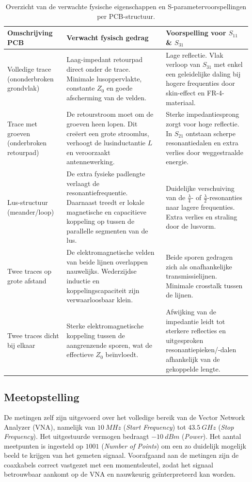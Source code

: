 \documentclass[twoside,kul]{kulakreport} %
\begin{document}
	\begin{table}[htbp]
		\centering
		\caption{Overzicht van de verwachte fysische eigenschappen en S-parametervoorspellingen per PCB-structuur.}
		\label{tab:traces_verwachtingen}
		\renewcommand{\arraystretch}{1.3}
		\begin{tabularx}{\textwidth}{>{\raggedright\arraybackslash}p{3.2cm} X X}
			\toprule
			\textbf{Omschrijving PCB} & \textbf{Verwacht fysisch gedrag} & \textbf{Voorspelling voor $S_{11}$ \& $S_{31}$} \\
			\midrule
			Volledige trace (ononderbroken grondvlak) & Laag-impedant retourpad direct onder de trace. Minimale lusoppervlakte, constante $Z_0$ en goede afscherming van de velden. & Lage reflectie. Vlak verloop van $S_{31}$ met enkel een geleidelijke daling bij hogere frequenties door skin-effect en FR-4-materiaal. \\
			\addlinespace
			Trace met groeven (onderbroken retourpad) & De retourstroom moet om de groeven heen lopen. Dit creëert een grote stroomlus, verhoogt de lusinductantie $L$ en veroorzaakt antennewerking. & Sterke impedantiesprong zorgt voor hoge reflectie. In $S_{21}$ ontstaan scherpe resonantiedalen en extra verlies door weggestraalde energie. \\
			\addlinespace
			Lus-structuur (meander/loop) & De extra fysieke padlengte verlaagt de resonantiefrequentie. Daarnaast treedt er lokale magnetische en capacitieve koppeling op tussen de parallelle segmenten van de lus. & Duidelijke verschuiving van de $\frac{\lambda}{4}$- of $\frac{\lambda}{2}$-resonanties naar lagere frequenties. Extra verlies en straling door de lusvorm. \\
			\addlinespace
			Twee traces op grote afstand & De elektromagnetische velden van beide lijnen overlappen nauwelijks. Wederzijdse inductie en koppelingscapaciteit zijn verwaarloosbaar klein. & Beide sporen gedragen zich als onafhankelijke transmissielijnen. Minimale crosstalk tussen de lijnen. \\
			\addlinespace
			Twee traces dicht bij elkaar & Sterke elektromagnetische koppeling tussen de aangrenzende sporen, wat de effectieve $Z_0$ beïnvloedt. & Afwijking van de impedantie leidt tot sterkere reflecties en uitgesproken resonantiepieken/-dalen afhankelijk van de gekoppelde lengte. \\
			\bottomrule
		\end{tabularx}
	\end{table}

	\subsection{Meetopstelling}
	De metingen zelf zijn uitgevoerd over het volledige bereik van de Vector Network Analyzer (VNA), namelijk van $\SI{10}{MHz}$ (\textit{Start Frequency}) tot $\SI{43,5}{GHz}$ (\textit{Stop Frequency}). Het uitgestuurde vermogen bedraagt $\SI{-10}{dBm}$ (\textit{Power}). Het aantal meetpunten is ingesteld op $1001$ (\textit{Number of Points}) om een zo duidelijk mogelijk beeld te krijgen van het gemeten signaal. Voorafgaand aan de metingen zijn de coaxkabels correct vastgezet met een momentsleutel, zodat het signaal betrouwbaar aankomt op de VNA en nauwkeurig geïnterpreteerd kan worden.
\end{document}
